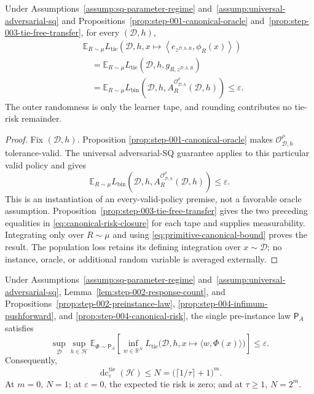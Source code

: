 \begin{proposition}
\label{prop:step-004-canonical-risk}
Under Assumptions~\ref{assump:sq-parameter-regime}
and~\ref{assump:universal-adversarial-sq} and
Propositions~\ref{prop:step-001-canonical-oracle}
and~\ref{prop:step-003-tie-free-transfer}, for every
\((\mathcal D,h)\),
\[
\begin{aligned}
&\mathbb E_{R\sim\mu}
L_{\mathrm{tie}}\!\left(
\mathcal D,h,
x\mapsto\left\langle e_{z^{\mathcal D,h,R}},\phi_R(x)\right\rangle
\right)\\
&\quad=\mathbb E_{R\sim\mu}
L_{\mathrm{tie}}(\mathcal D,h,g_{R,z^{\mathcal D,h,R}})\\
&\quad=\mathbb E_{R\sim\mu}
L_{\mathrm{bin}}\!\left(
\mathcal D,h,
A_R^{\mathcal O^\rho_{\mathcal D,h}}(\mathcal D,h)
\right)
\le\varepsilon.
\end{aligned}
\tag{A.35}\label{eq:canonical-risk-closure}
\]
The outer randomness is only the learner tape, and rounding contributes no
tie-risk remainder.
\end{proposition}

\begin{proof}
Fix \((\mathcal D,h)\).  Proposition
\ref{prop:step-001-canonical-oracle} makes
\(\mathcal O^\rho_{\mathcal D,h}\) tolerance-valid.  The universal
adversarial-SQ guarantee applies to this particular valid policy and gives
\[
\mathbb E_{R\sim\mu}
L_{\mathrm{bin}}\!\left(
\mathcal D,h,
A_R^{\mathcal O^\rho_{\mathcal D,h}}(\mathcal D,h)
\right)
\le\varepsilon.
\tag{A.36}\label{eq:primitive-canonical-bound}
\]
This is an instantiation of an every-valid-policy premise, not a favorable
oracle assumption.  Proposition~\ref{prop:step-003-tie-free-transfer} gives
the two preceding equalities in \eqref{eq:canonical-risk-closure} for each
tape and supplies measurability.  Integrating only over \(R\sim\mu\) and
using \eqref{eq:primitive-canonical-bound} proves the result.  The population
loss retains its defining integration over \(x\sim\mathcal D\); no instance,
oracle, or additional random variable is averaged externally.
\end{proof}

\begin{proposition}
\label{prop:step-004-dimension-certificate}
Under Assumptions~\ref{assump:sq-parameter-regime}
and~\ref{assump:universal-adversarial-sq},
Lemma~\ref{lem:step-002-response-count}, and
Propositions~\ref{prop:step-002-preinstance-law},
\ref{prop:step-004-infimum-pushforward}, and
\ref{prop:step-004-canonical-risk}, the single pre-instance law
\(\mathsf P_A\) satisfies
\[
\sup_{\mathcal D}\sup_{h\in\mathcal H}
\mathbb E_{\Phi\sim\mathsf P_A}
\left[
\inf_{w\in\mathbb R^N}
L_{\mathrm{tie}}\bigl(
\mathcal D,h,x\mapsto\langle w,\Phi(x)\rangle
\bigr)
\right]
\le\varepsilon.
\tag{A.37}\label{eq:uniform-risk-certificate}
\]
Consequently,
\[
\operatorname{dc}^{\mathrm{tie}}_\varepsilon(\mathcal H)
\le N=\bigl(\lceil1/\tau\rceil+1\bigr)^m.
\tag{A.38}\label{eq:dimension-certificate}
\]
At \(m=0\), \(N=1\); at \(\varepsilon=0\), the expected tie risk is
zero; and at \(\tau\ge1\), \(N=2^m\).
\end{proposition}

